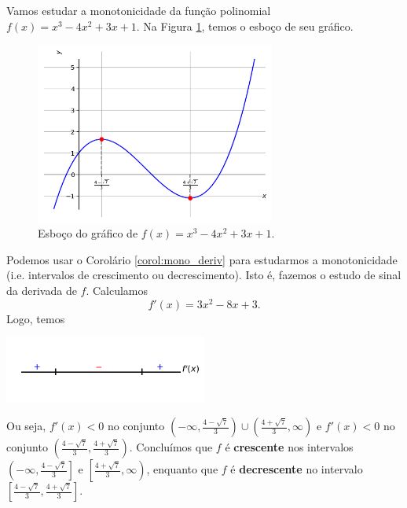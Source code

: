 \begin{ex}
  Vamos estudar a monotonicidade da função polinomial $f(x) = x^3 - 4x^2 + 3x + 1$. Na Figura \ref{fig:ex_corol_mono_deriv}, temos o esboço de seu gráfico.
  
  \begin{figure}[H]
    \centering
    \includegraphics[width=0.7\textwidth]{./cap_apderiv/dados/fig_ex_corol_mono_deriv/fig_ex_corol_mono_deriv}
    \caption{Esboço do gráfico de $f(x) = x^3 - 4x^2 + 3x + 1$.}
    \label{fig:ex_corol_mono_deriv}
  \end{figure}

  Podemos usar o Corolário \ref{corol:mono_deriv} para estudarmos a monotonicidade (i.e. intervalos de crescimento ou decrescimento). Isto é, fazemos o estudo de sinal da derivada de $f$. Calculamos
  \begin{equation}
    f'(x) = 3x^2 - 8x + 3.
  \end{equation}
  Logo, temos
  \begin{center}
    \includegraphics[width=0.5\textwidth]{./cap_apderiv/dados/fig_ex_monoderiv_poli/fig_ex_monoderiv_poli}
  \end{center}
  Ou seja, $f'(x) < 0$ no conjunto $\displaystyle \left(-\infty, \frac{4-\sqrt{7}}{3}\right)\cup \left(\frac{4+\sqrt{7}}{3}, \infty\right)$ e $f'(x) < 0$ no conjunto $\displaystyle \left(\frac{4-\sqrt{7}}{3}, \frac{4+\sqrt{7}}{3}\right)$. Concluímos que $f$ é {\bf crescente} nos intervalos $\displaystyle \left(\left.-\infty, \frac{4-\sqrt{7}}{3}\right.\right]$ e $\displaystyle \left[\left.\frac{4+\sqrt{7}}{3}, \infty\right)\right.$, enquanto que $f$ é {\bf decrescente} no intervalo $\displaystyle \left[\frac{4-\sqrt{7}}{3}, \frac{4+\sqrt{7}}{3}\right]$.
\end{ex}

